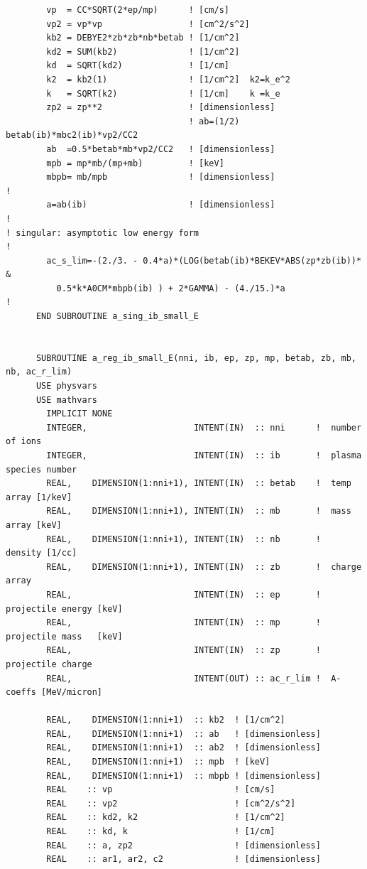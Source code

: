 \documentclass[preprint,12pt,eqsecnum,nofootinbib,amsmath,amssymb]{revtex4}
\begin{document}
{\begin{verbatim}
        vp  = CC*SQRT(2*ep/mp)      ! [cm/s]
        vp2 = vp*vp                 ! [cm^2/s^2]
        kb2 = DEBYE2*zb*zb*nb*betab ! [1/cm^2]
        kd2 = SUM(kb2)              ! [1/cm^2]
        kd  = SQRT(kd2)             ! [1/cm]
        k2  = kb2(1)                ! [1/cm^2]  k2=k_e^2
        k   = SQRT(k2)              ! [1/cm]    k =k_e
        zp2 = zp**2                 ! [dimensionless]
                                    ! ab=(1/2) betab(ib)*mbc2(ib)*vp2/CC2
        ab  =0.5*betab*mb*vp2/CC2   ! [dimensionless] 
        mpb = mp*mb/(mp+mb)         ! [keV]
        mbpb= mb/mpb                ! [dimensionless]
!
        a=ab(ib)                    ! [dimensionless] 
!
! singular: asymptotic low energy form
!
        ac_s_lim=-(2./3. - 0.4*a)*(LOG(betab(ib)*BEKEV*ABS(zp*zb(ib))* &
          0.5*k*A0CM*mbpb(ib) ) + 2*GAMMA) - (4./15.)*a
!
      END SUBROUTINE a_sing_ib_small_E


      SUBROUTINE a_reg_ib_small_E(nni, ib, ep, zp, mp, betab, zb, mb, nb, ac_r_lim)
      USE physvars
      USE mathvars      
        IMPLICIT NONE
        INTEGER,                     INTENT(IN)  :: nni      !  number of ions
        INTEGER,                     INTENT(IN)  :: ib       !  plasma species number
        REAL,    DIMENSION(1:nni+1), INTENT(IN)  :: betab    !  temp array [1/keV]
        REAL,    DIMENSION(1:nni+1), INTENT(IN)  :: mb       !  mass array [keV]
        REAL,    DIMENSION(1:nni+1), INTENT(IN)  :: nb       !  density [1/cc]
        REAL,    DIMENSION(1:nni+1), INTENT(IN)  :: zb       !  charge array
        REAL,                        INTENT(IN)  :: ep       !  projectile energy [keV]
        REAL,                        INTENT(IN)  :: mp       !  projectile mass   [keV]
        REAL,                        INTENT(IN)  :: zp       !  projectile charge
        REAL,                        INTENT(OUT) :: ac_r_lim !  A-coeffs [MeV/micron]

        REAL,    DIMENSION(1:nni+1)  :: kb2  ! [1/cm^2]
        REAL,    DIMENSION(1:nni+1)  :: ab   ! [dimensionless]
        REAL,    DIMENSION(1:nni+1)  :: ab2  ! [dimensionless]
        REAL,    DIMENSION(1:nni+1)  :: mpb  ! [keV]
        REAL,    DIMENSION(1:nni+1)  :: mbpb ! [dimensionless]
        REAL    :: vp                        ! [cm/s]
        REAL    :: vp2                       ! [cm^2/s^2]
        REAL    :: kd2, k2                   ! [1/cm^2]
        REAL    :: kd, k                     ! [1/cm]
        REAL    :: a, zp2                    ! [dimensionless]
        REAL    :: ar1, ar2, c2              ! [dimensionless]


\end{verbatim}}
\end{document}
